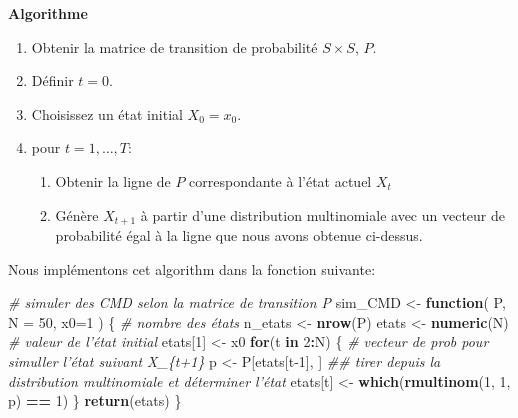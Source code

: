 \documentclass[
]{book}
\newenvironment{Shaded}{\begin{snugshade}}{\end{snugshade}}
\newcommand{\CommentTok}[1]{\textcolor[rgb]{0.56,0.35,0.01}{\textit{#1}}}
\newcommand{\ControlFlowTok}[1]{\textcolor[rgb]{0.13,0.29,0.53}{\textbf{#1}}}
\newcommand{\DataTypeTok}[1]{\textcolor[rgb]{0.13,0.29,0.53}{#1}}
\newcommand{\DecValTok}[1]{\textcolor[rgb]{0.00,0.00,0.81}{#1}}
\newcommand{\KeywordTok}[1]{\textcolor[rgb]{0.13,0.29,0.53}{\textbf{#1}}}
\newcommand{\NormalTok}[1]{#1}
\newcommand{\OperatorTok}[1]{\textcolor[rgb]{0.81,0.36,0.00}{\textbf{#1}}}
\newcommand{\StringTok}[1]{\textcolor[rgb]{0.31,0.60,0.02}{#1}}
\providecommand{\tightlist}{%
  \setlength{\itemsep}{0pt}\setlength{\parskip}{0pt}}
\theoremstyle{definition}
\theoremstyle{definition}
\theoremstyle{definition}
\theoremstyle{remark}
\begin{document}
\textbf{Algorithme}

\begin{enumerate}
\def\labelenumi{\arabic{enumi}.}
\tightlist
\item
  Obtenir la matrice de transition de probabilité \(S\times S\), \(P\).
\item
  Définir \(t=0\).
\item
  Choisissez un état initial \(X_0 = x_0\).
\item
  pour \(t=1, \ldots , T\):

  \begin{enumerate}
  \def\labelenumii{\alph{enumii})}
  \tightlist
  \item
    Obtenir la ligne de \(P\) correspondante à l'état actuel \(X_t\)
  \item
    Génère \(X_{t + 1}\) à partir d'une distribution multinomiale avec un vecteur de probabilité égal à la ligne que nous avons obtenue ci-dessus.
  \end{enumerate}
\end{enumerate}

Nous implémentons cet algorithm dans la fonction suivante:

\begin{Shaded}
\begin{Highlighting}[]
\CommentTok{# simuler des CMD selon la matrice de transition P}
\NormalTok{sim_CMD <-}\StringTok{ }\ControlFlowTok{function}\NormalTok{( P, }\DataTypeTok{N =} \DecValTok{50}\NormalTok{, }\DataTypeTok{x0=}\DecValTok{1}\NormalTok{ ) \{}
  \CommentTok{# nombre des états}
\NormalTok{  n_etats <-}\StringTok{ }\KeywordTok{nrow}\NormalTok{(P)}
\NormalTok{  etats <-}\StringTok{ }\KeywordTok{numeric}\NormalTok{(N)}
  \CommentTok{# valeur de l'état initial }
\NormalTok{  etats[}\DecValTok{1}\NormalTok{] <-}\StringTok{ }\NormalTok{x0}
  \ControlFlowTok{for}\NormalTok{(t }\ControlFlowTok{in} \DecValTok{2}\OperatorTok{:}\NormalTok{N) \{}
    \CommentTok{# vecteur de prob pour simuller l'état suivant X_\{t+1\}}
\NormalTok{    p <-}\StringTok{ }\NormalTok{P[etats[t}\DecValTok{-1}\NormalTok{], ]}
    \CommentTok{## tirer depuis la distribution multinomiale et déterminer l'état}
\NormalTok{    etats[t] <-}\StringTok{ }\KeywordTok{which}\NormalTok{(}\KeywordTok{rmultinom}\NormalTok{(}\DecValTok{1}\NormalTok{, }\DecValTok{1}\NormalTok{, p) }\OperatorTok{==}\StringTok{ }\DecValTok{1}\NormalTok{)}
\NormalTok{  \}}
  \KeywordTok{return}\NormalTok{(etats)}
\NormalTok{\}}
\end{Highlighting}
\end{Shaded}
\end{document}
